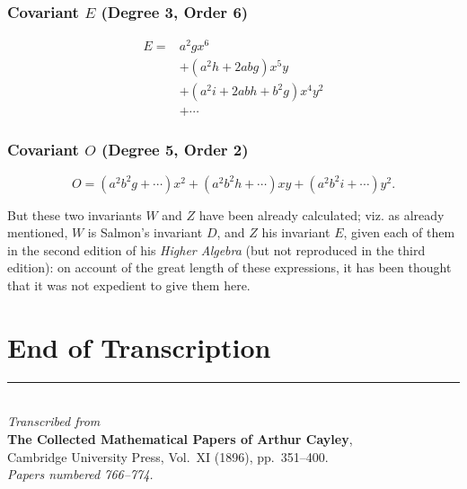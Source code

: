 \documentclass[11pt,a4paper]{book}
\begin{document}
\subsubsection*{Covariant $E$ (Degree 3, Order 6)}

\[
\begin{aligned}
E ={}& a^2gx^6 \\
& + (a^2h + 2abg)x^5y \\
& + (a^2i + 2abh + b^2g)x^4y^2 \\
& + \dotsb
\end{aligned}
\]

\subsubsection*{Covariant $O$ (Degree 5, Order 2)}

\[
O = (a^2b^2g + \dotsb)x^2 + (a^2b^2h + \dotsb)xy + (a^2b^2i + \dotsb)y^2.
\]

But these two invariants $W$ and $Z$ have been already calculated; viz. as already mentioned, $W$ is Salmon's invariant $D$, and $Z$ his invariant $E$, given each of them in the second edition of his \textit{Higher Algebra} (but not reproduced in the third edition): on account of the great length of these expressions, it has been thought that it was not expedient to give them here.

\newpage
\section*{End of Transcription}

\vspace{2cm}
\begin{center}
\rule{0.5\textwidth}{0.4pt}\\[12pt]
\textit{Transcribed from}\\
\textbf{The Collected Mathematical Papers of Arthur Cayley},\\
Cambridge University Press, Vol.~XI (1896), pp.~351--400.\\[6pt]
\textit{Papers numbered 766--774.}
\end{center}
\clearpage


\thispagestyle{empty}
\end{document}
